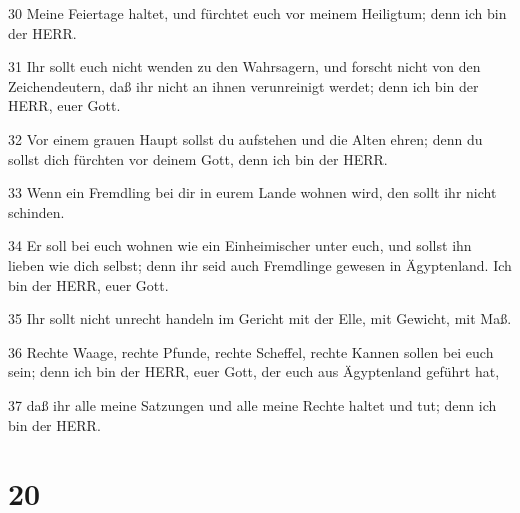 \par 30 Meine Feiertage haltet, und fürchtet euch vor meinem Heiligtum; denn ich bin der HERR.
\par 31 Ihr sollt euch nicht wenden zu den Wahrsagern, und forscht nicht von den Zeichendeutern, daß ihr nicht an ihnen verunreinigt werdet; denn ich bin der HERR, euer Gott.
\par 32 Vor einem grauen Haupt sollst du aufstehen und die Alten ehren; denn du sollst dich fürchten vor deinem Gott, denn ich bin der HERR.
\par 33 Wenn ein Fremdling bei dir in eurem Lande wohnen wird, den sollt ihr nicht schinden.
\par 34 Er soll bei euch wohnen wie ein Einheimischer unter euch, und sollst ihn lieben wie dich selbst; denn ihr seid auch Fremdlinge gewesen in Ägyptenland. Ich bin der HERR, euer Gott.
\par 35 Ihr sollt nicht unrecht handeln im Gericht mit der Elle, mit Gewicht, mit Maß.
\par 36 Rechte Waage, rechte Pfunde, rechte Scheffel, rechte Kannen sollen bei euch sein; denn ich bin der HERR, euer Gott, der euch aus Ägyptenland geführt hat,
\par 37 daß ihr alle meine Satzungen und alle meine Rechte haltet und tut; denn ich bin der HERR.

\chapter{20}

